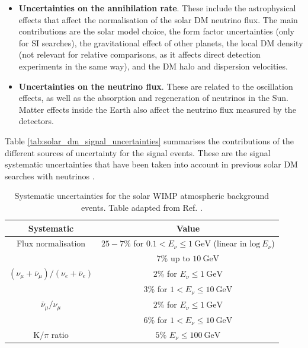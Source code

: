 \begin{itemize}
	\item \textbf{Uncertainties on the annihilation rate}. These include the astrophysical effects that affect the normalisation of the solar DM neutrino flux. The main contributions are the solar model choice, the form factor uncertainties (only for SI searches), the gravitational effect of other planets, the local DM density (not relevant for relative comparisons, as it affects direct detection experiments in the same way), and the DM halo and dispersion velocities.
	\item \textbf{Uncertainties on the neutrino flux}. These are related to the oscillation effects, as well as the absorption and regeneration of neutrinos in the Sun. Matter effects inside the Earth also affect the neutrino flux measured by the detectors.
\end{itemize}

Table \ref{tab:solar_dm_signal_uncertainties} summarises the contributions of the different sources of uncertainty for the signal events. These are the signal systematic uncertainties that have been taken into account in previous solar DM searches with neutrinos \cite{Boliev2013,Super-Kamiokande2015,Principato2021}.

\begin{table}[t]
	\caption[Systematic uncertainties for the solar WIMP atmospheric background events.]{Systematic uncertainties for the solar WIMP atmospheric background events. Table adapted from Ref. \cite{Super-Kamiokande2017}.}
	\begin{center}
		\begin{small}
			\begin{tabular}{c|c}
				Systematic                                            & Value \\[2mm] \hline
				\rule{0pt}{1.1\normalbaselineskip}Flux normalisation                                    & $25-7\%$ for $0.1 < E_{\nu} \leq 1~\mathrm{GeV}$ (linear in $\mathrm{log} ~ E_{\nu}$)\\[1mm] & $7\%$ up to $10~\mathrm{GeV}$ \\[2mm]
				$(\nu_{\mu}+\bar{\nu}_{\mu})/(\nu_{e}+\bar{\nu}_{e})$ & $2\%$ for $E_{\nu} \leq 1~\mathrm{GeV}$ \\[1mm] & $3\%$ for $1 < E_{\nu} \leq 10~\mathrm{GeV}$ \\[2mm]
				$\bar{\nu}_{\mu}/\nu_{\mu}$                           & $2\%$ for $E_{\nu} \leq 1~\mathrm{GeV}$ \\[1mm] & $6\%$ for $1 < E_{\nu} \leq 10~\mathrm{GeV}$ \\[2mm]
				$\mathrm{K}/\pi$ ratio                                & $5\%$ $E_{\nu} \leq 100~\mathrm{GeV}$
			\end{tabular}
		\end{small}
	\end{center}
	\label{tab:solar_dm_background_uncertainties}
\end{table}


